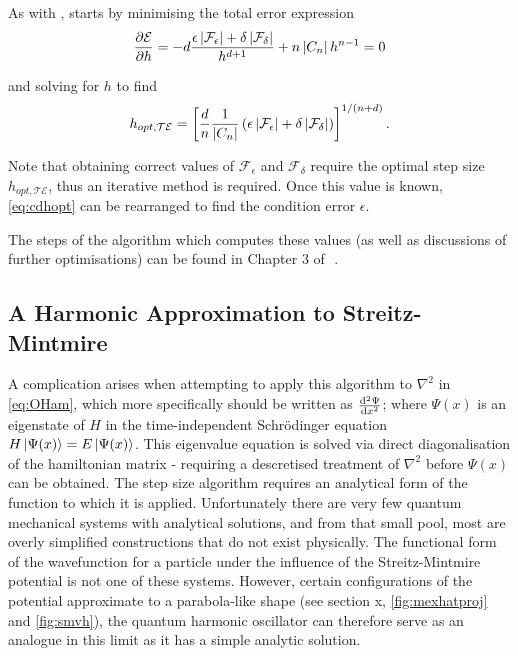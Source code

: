 As with \citeauthor{Gill1982}, \citeauthor{Mathur2012} starts by minimising the total error expression
\begin{equation}
\frac{\partial\mathcal{E}}{\partial h} = -d\frac{\epsilon\left\lvert \mathcal{F}_\epsilon\right\rvert+\delta\left\lvert \mathcal{F}_\delta\right\rvert}{h^{d+1}} + n\left\lvert C_n\right\rvert h^{n-1} = 0
\end{equation}

and solving for $h$ to find
\begin{equation}
h_{opt,\mathcal{TE}} = \left[\frac{d}{n}\frac{1}{\left\lvert C_n\right\rvert}\left(\epsilon\left\lvert \mathcal{F}_\epsilon\right\rvert+
\delta\left\lvert \mathcal{F}_\delta\right\rvert\right)\right]^{1/(n+d)}.\label{eq:cdhopt}
\end{equation}

Note that obtaining correct values of $\mathcal{F}_\epsilon$ and $\mathcal{F}_\delta$ require the optimal step size $h_{opt,\mathcal{TE}}$, thus an iterative method is required.
Once this value is known, \cref{eq:cdhopt} can be rearranged to find the condition error $\epsilon$.

The steps of the algorithm which computes these values (as well as discussions of further optimisations) can be found in Chapter 3 of~\,.

\subsection{A Harmonic Approximation to Streitz-Mintmire}\label{subsec:harmsm}

A complication arises when attempting to apply this algorithm to $\nabla^2$ in \cref{eq:OHam}, which more specifically should be written as $\cramped{\frac{\mathrm{d}^2\Psi}{\mathrm{d}x^2}}$; where $\Psi(x)$ is an eigenstate of $H$ in the time-independent Schr\"odinger equation $H\left\lvert \Psi(x) \right\rangle = E\left\lvert \Psi(x) \right\rangle$.
This eigenvalue equation is solved via direct diagonalisation of the hamiltonian matrix - requiring a descretised treatment of $\nabla^2$ before $\Psi(x)$ can be obtained.
The step size algorithm requires an analytical form of the function to which it is applied.
Unfortunately there are very few quantum mechanical systems with analytical solutions, and from that small pool, most are overly simplified constructions that do not exist physically.
The functional form of the wavefunction for a particle under the influence of the Streitz-Mintmire potential is not one of these systems.
However, certain configurations of the potential approximate to a parabola-like shape (see section x, \cref{fig:mexhatproj} and \cref{fig:smvh}), the quantum harmonic oscillator can therefore serve as an analogue in this limit as it has a simple analytic solution.

